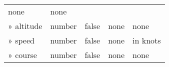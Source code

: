 \documentclass[
]{article}
\begin{document}
\begin{longtable}[]{@{}lllll@{}}
\begin{minipage}[t]{0.17\columnwidth}
none\strut
\end{minipage} & \begin{minipage}[t]{0.17\columnwidth}\raggedright
none\strut
\end{minipage}\tabularnewline
\begin{minipage}[t]{0.17\columnwidth}\raggedright
» altitude\strut
\end{minipage} & \begin{minipage}[t]{0.17\columnwidth}\raggedright
number\strut
\end{minipage} & \begin{minipage}[t]{0.17\columnwidth}\raggedright
false\strut
\end{minipage} & \begin{minipage}[t]{0.17\columnwidth}\raggedright
none\strut
\end{minipage} & \begin{minipage}[t]{0.17\columnwidth}\raggedright
none\strut
\end{minipage}\tabularnewline
\begin{minipage}[t]{0.17\columnwidth}\raggedright
» speed\strut
\end{minipage} & \begin{minipage}[t]{0.17\columnwidth}\raggedright
number\strut
\end{minipage} & \begin{minipage}[t]{0.17\columnwidth}\raggedright
false\strut
\end{minipage} & \begin{minipage}[t]{0.17\columnwidth}\raggedright
none\strut
\end{minipage} & \begin{minipage}[t]{0.17\columnwidth}\raggedright
in knots\strut
\end{minipage}\tabularnewline
\begin{minipage}[t]{0.17\columnwidth}\raggedright
» course\strut
\end{minipage} & \begin{minipage}[t]{0.17\columnwidth}\raggedright
number\strut
\end{minipage} & \begin{minipage}[t]{0.17\columnwidth}\raggedright
false\strut
\end{minipage} & \begin{minipage}[t]{0.17\columnwidth}\raggedright
none\strut
\end{minipage} & \begin{minipage}[t]{0.17\columnwidth}\raggedright
none\strut

\end{minipage}
\end{longtable}
\end{document}
